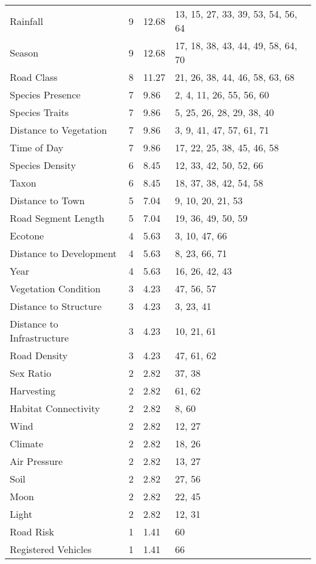 \begin{table}[htp]
\begin{tabularx}{0.9\textwidth}{lYYY}
  Rainfall &   9 & 12.68 & 13, 15, 27, 33, 39, 53, 54, 56, 64 \\ 
  Season &   9 & 12.68 & 17, 18, 38, 43, 44, 49, 58, 64, 70 \\ 
  Road Class &   8 & 11.27 & 21, 26, 38, 44, 46, 58, 63, 68 \\ 
  Species Presence &   7 & 9.86 & 2, 4, 11, 26, 55, 56, 60 \\ 
  Species Traits &   7 & 9.86 & 5, 25, 26, 28, 29, 38, 40 \\ 
  Distance to Vegetation &   7 & 9.86 & 3, 9, 41, 47, 57, 61, 71 \\ 
  Time of Day &   7 & 9.86 & 17, 22, 25, 38, 45, 46, 58 \\ 
  Species Density &   6 & 8.45 & 12, 33, 42, 50, 52, 66 \\ 
  Taxon &   6 & 8.45 & 18, 37, 38, 42, 54, 58 \\ 
  Distance to Town &   5 & 7.04 & 9, 10, 20, 21, 53 \\ 
  Road Segment Length &   5 & 7.04 & 19, 36, 49, 50, 59 \\ 
  Ecotone &   4 & 5.63 & 3, 10, 47, 66 \\ 
  Distance to Development &   4 & 5.63 & 8, 23, 66, 71 \\ 
  Year &   4 & 5.63 & 16, 26, 42, 43 \\ 
  Vegetation Condition &   3 & 4.23 & 47, 56, 57 \\ 
  Distance to Structure &   3 & 4.23 & 3, 23, 41 \\ 
  Distance to Infrastructure &   3 & 4.23 & 10, 21, 61 \\ 
  Road Density &   3 & 4.23 & 47, 61, 62 \\ 
  Sex Ratio &   2 & 2.82 & 37, 38 \\ 
  Harvesting &   2 & 2.82 & 61, 62 \\ 
  Habitat Connectivity &   2 & 2.82 & 8, 60 \\ 
  Wind &   2 & 2.82 & 12, 27 \\ 
  Climate &   2 & 2.82 & 18, 26 \\ 
  Air Pressure &   2 & 2.82 & 13, 27 \\ 
  Soil &   2 & 2.82 & 27, 56 \\ 
  Moon &   2 & 2.82 & 22, 45 \\ 
  Light &   2 & 2.82 & 12, 31 \\ 
  Road Risk &   1 & 1.41 & 60 \\ 
  Registered Vehicles &   1 & 1.41 & 66 \\ 

\end{tabularx}
\end{table}
